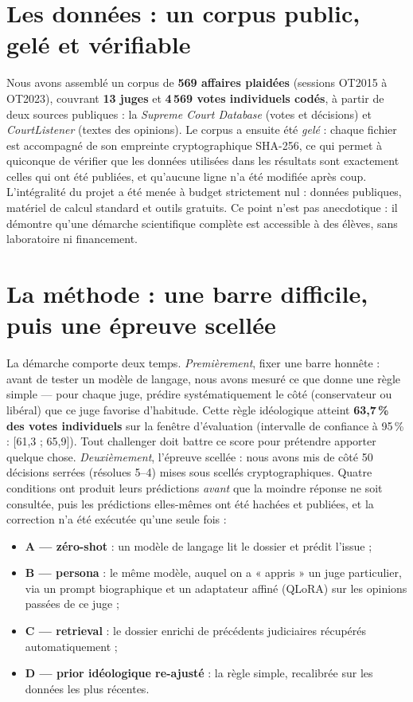 \documentclass[11pt,a4paper]{article}
\begin{document}
\section*{Les données : un corpus public, gelé et vérifiable}

Nous avons assemblé un corpus de \textbf{569 affaires plaidées}
(sessions OT2015 à OT2023), couvrant \textbf{13 juges} et
\textbf{4\,569 votes individuels codés}, à partir de deux sources publiques :
la \emph{Supreme Court Database} (votes et décisions) et
\emph{CourtListener} (textes des opinions). Le corpus a ensuite été
\emph{gelé} : chaque fichier est accompagné de son empreinte
cryptographique SHA-256, ce qui permet à quiconque de vérifier que les
données utilisées dans les résultats sont exactement celles qui ont été
publiées, et qu'aucune ligne n'a été modifiée après coup. L'intégralité du
projet a été menée à budget strictement nul : données publiques, matériel
de calcul standard et outils gratuits. Ce point n'est pas anecdotique : il
démontre qu'une démarche scientifique complète est accessible à des élèves,
sans laboratoire ni financement.

\section*{La méthode : une barre difficile, puis une épreuve scellée}

La démarche comporte deux temps. \emph{Premièrement}, fixer une barre
honnête : avant de tester un modèle de langage, nous avons mesuré ce que
donne une règle simple --- pour chaque juge, prédire systématiquement le
côté (conservateur ou libéral) que ce juge favorise d'habitude. Cette règle
idéologique atteint \textbf{63,7\,\% des votes individuels} sur la fenêtre
d'évaluation (intervalle de confiance à 95\,\% : [61,3 ; 65,9]). Tout
challenger doit battre ce score pour prétendre apporter quelque chose.
\emph{Deuxièmement}, l'épreuve scellée : nous avons mis de côté 50 décisions
serrées (résolues 5--4) mises sous scellés cryptographiques. Quatre
conditions ont produit leurs prédictions \emph{avant} que la moindre réponse
ne soit consultée, puis les prédictions elles-mêmes ont été hachées et
publiées, et la correction n'a été exécutée qu'une seule fois :
\begin{itemize}[leftmargin=1.4em,itemsep=2pt,topsep=4pt]
  \item \textbf{A --- zéro-shot} : un modèle de langage lit le dossier et
  prédit l'issue ;
  \item \textbf{B --- persona} : le même modèle, auquel on a « appris » un
  juge particulier, via un prompt biographique et un adaptateur affiné
  (QLoRA) sur les opinions passées de ce juge ;
  \item \textbf{C --- retrieval} : le dossier enrichi de précédents
  judiciaires récupérés automatiquement ;
  \item \textbf{D --- prior idéologique re-ajusté} : la règle simple,
  recalibrée sur les données les plus récentes.
\end{itemize}
\end{document}
